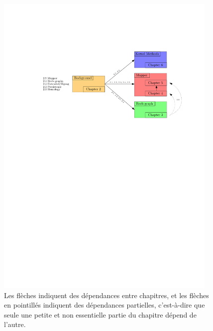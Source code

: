 
\begin{figure}\centering
\includegraphics[width=0.95\textwidth]{figures/ThesisPlan}
\caption[Plan de la th\`ese]{\label{fig:these} Les fl\`eches indiquent des d\'ependances entre chapitres, 
et les fl\`eches en pointill\'es indiquent des d\'ependances partielles, c'est-\`a-dire que seule une petite
et non essentielle partie du chapitre d\'epend de l'autre. %
}


\end{figure}


